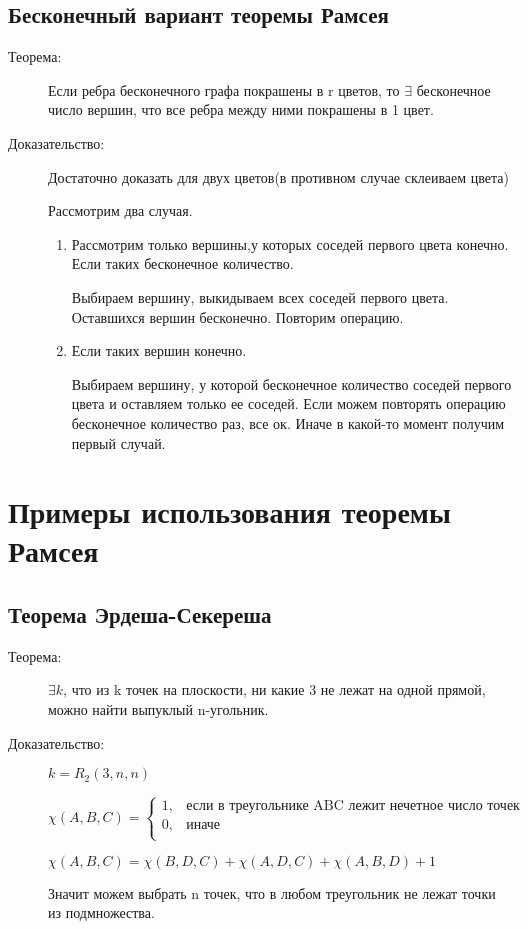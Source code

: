 \documentclass[12pt]{article}
\begin{document}
\subsection{Бесконечный вариант теоремы Рамсея}

\begin{description}
\item[Теорема:] Если ребра бесконечного графа покрашены в r цветов, то $\exists$ бесконечное число вершин, что все ребра между ними покрашены в 1 цвет. 
\item[Доказательство:] Достаточно доказать для двух цветов(в противном случае склеиваем цвета)

Рассмотрим два случая.

\begin{enumerate}
\item Рассмотрим только вершины,у которых соседей первого цвета конечно. Если таких бесконечное количество. 

Выбираем вершину, выкидываем всех соседей первого цвета. Оставшихся вершин бесконечно. Повторим операцию.

\item 
Если таких вершин конечно. 

Выбираем вершину, у которой бесконечное количество соседей первого цвета и оставляем только ее соседей. Если можем повторять операцию бесконечное количество раз, все ок. Иначе в какой-то момент получим первый случай. 

\end{enumerate}

\end{description}

\section{Примеры использования теоремы Рамсея}

\subsection{Теорема Эрдеша-Секереша}
\begin{description}
\item [Теорема:] $\exists k$, что из k точек на плоскости, ни какие 3 не лежат на одной прямой, можно найти выпуклый n-угольник.
\item[Доказательство:]
$k = R_2(3, n, n)$

$\chi(A, B, C) = \begin{cases} 1, & \text{если в треугольнике ABC лежит нечетное число точек}\\ 0, & \text{иначе}\\\end{cases}$

$\chi(A, B, C) = \chi(B, D, C) + \chi(A, D, C) + \chi(A, B, D) + 1$

Значит можем выбрать n точек, что в любом треугольник не лежат точки из подмножества. 

\end{description}
\end{document}
